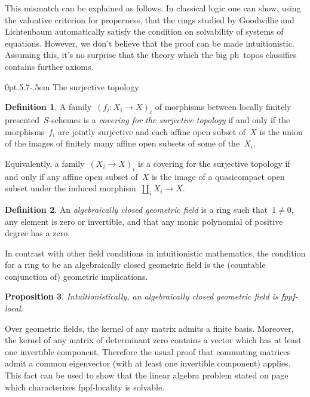 \documentclass[10pt,reqno,a4paper]{amsbook}
\makeatletter
\theoremstyle{definition}
\newtheorem{defn}{Definition}[section]
\theoremstyle{plain}
\newtheorem{prop}[defn]{Proposition}
\theoremstyle{remark}
\newcommand{\?}{\,{:}\,}
\renewcommand{\_}{\mathpunct{.}\,}
\renewenvironment{proof}[1][\proofname]{\par
  \pushQED{\qed}%
  \normalfont \topsep6\p@\@plus6\p@\relax
  \trivlist
  \item[\hskip\labelsep
        \itshape
    #1\@addpunct{.}]\ignorespaces
}{%
  \popQED\endtrivlist\@endpefalse
}
\def\subsection{\@startsection{subsection}{2}%
  {0pt}{.5\linespacing\@plus.7\linespacing}{-.5em}%
  {\normalfont\bfseries}}
\makeatother
\begin{document}
This mismatch can be explained as follows. In classical logic one can show,
using the valuative criterion for properness, that the rings studied by
Goodwillie and Lichtenbaum automatically satisfy the condition on solvability
of systems of equations. However, we don't believe that the proof can be made
intuitionistic. Assuming this, it's no surprise that the theory which the big
ph~topos classifies contains further axioms.


\subsection{The surjective topology}

\begin{defn}A family~$(f_i : X_i \to X)_i$ of morphisms between locally finitely
presented~$S$-schemes is a \emph{covering for the surjective topology} if and
only if the morphisms~$f_i$ are jointly surjective and each affine open subset
of~$X$ is the union of the images of finitely many affine open subsets of some of
the~$X_i$.
\end{defn}

Equivalently, a family~$(X_i \to X)_i$ is a covering for the surjective
topology if and only if any affine open subset of~$X$ is the image of a
quasicompact open subset under the induced morphism~$\coprod_i X_i \to X$.

\begin{defn}An \emph{algebraically closed geometric field} is a ring such
that~$1 \neq 0$, any element is zero or invertible, and that any monic
polynomial of positive degree has a zero.
\end{defn}

In contrast with other field conditions in intuitionistic mathematics, the
condition for a ring to be an algebraically closed geometric field is the
(countable conjunction of) geometric implications.

\begin{prop}\label{prop:alg-closed-field-is-fppf-local}
Intuitionistically, an algebraically closed geometric field is
fppf-local.
\end{prop}

\begin{proof}Over geometric fields, the kernel of any matrix admits a finite
basis. Moreover, the kernel of any matrix of determinant zero contains a vector
which has at least one invertible component. Therefore the usual proof that
commuting matrices admit a common eigenvector (with at least one invertible
component) applies. This fact can be used to show that the linear algebra
problem stated on page~\pageref{page:fppf-linear-algebra} which characterizes
fppf-locality is solvable.
\end{proof}
\end{document}

